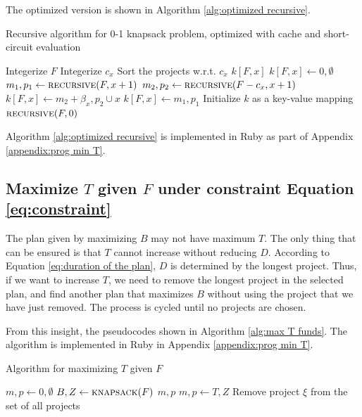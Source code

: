 \documentclass{article}
\begin{document}
The optimized version is shown in Algorithm \ref{alg:optimized recursive}.

\begin{algorithm}[h!]
\caption{Recursive algorithm for 0-1 knapsack problem, optimized with cache and short-circuit evaluation}
\label{alg:optimized recursive}
\begin{algorithmic}
\State Integerize $F$
	\State Integerize $c_x$
\EndFor
\State Sort the projects w.r.t. $c_x$
	\State\Return$k\left[F,x\right]$
	\State\Return$k\left[F,x\right]\leftarrow0,\emptyset$
\Else
	\State$m_1,p_1\leftarrow\Call{recursive}{F,x+1}$
	\State$m_2,p_2\leftarrow\Call{recursive}{F-c_x,x+1}$
		\State\Return$k\left[F,x\right]\leftarrow m_2+\beta_x,p_2\cup x$
	\Else
		\State\Return$k\left[F,x\right]\leftarrow m_1,p_1$
	\EndIf
\EndIf
\EndFunction
{}
\State Initialize $k$ as a key-value mapping
\State\Return$\Call{recursive}{F,0}$
\EndFunction
\end{algorithmic}
\end{algorithm}

Algorithm \ref{alg:optimized recursive} is implemented in Ruby as part of Appendix \ref{appendix:prog min T}.

\subsection{Maximize $T$ given $F$ under constraint Equation \ref{eq:constraint}}

The plan given by maximizing $B$ may not have maximum $T$.
The only thing that can be ensured is that $T$ cannot increase without reducing $D$.
According to Equation \ref{eq:duration of the plan}, $D$ is determined by the longest project.
Thus, if we want to increase $T$, we need to remove the longest project in the selected plan,
and find another plan that maximizes $B$ without using the project that we have just removed.
The process is cycled until no projects are chosen.

From this insight, the pseudocodes shown in Algorithm \ref{alg:max T funds}.
The algorithm is implemented in Ruby in Appendix \ref{appendix:prog min T}.

\begin{algorithm}[h!]
\caption{Algorithm for maximizing $T$ given $F$}
\label{alg:max T funds}
\begin{algorithmic}
\State$m,p\leftarrow0,\emptyset$
\Loop
	\State$B,Z\leftarrow\Call{knapsack}{F}$
		\State\Return$m,p$
	\EndIf
		\State$m,p\leftarrow T,Z$
	\EndIf
	\State Remove project $\xi$ from the set of all projects
\EndLoop
\end{algorithmic}
\end{algorithm}
\end{document}
